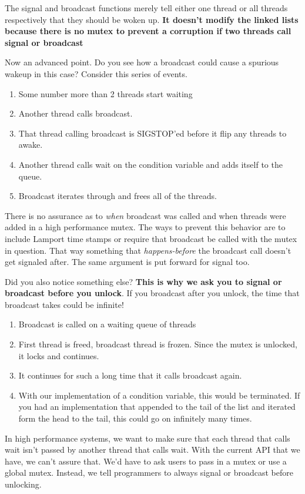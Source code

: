 The signal and broadcast functions merely tell either one thread or all threads respectively that they should be woken up.
\textbf{It doesn't modify the linked lists because there is no mutex to prevent a corruption if two threads call signal or broadcast}

Now an advanced point. Do you see how a broadcast could cause a spurious wakeup in this case? Consider this series of events.

\begin{enumerate}
\item Some number more than 2 threads start waiting
\item Another thread calls broadcast.
\item That thread calling broadcast is SIGSTOP'ed before it flip any threads to awake.
\item Another thread calls wait on the condition variable and adds itself to the queue.
\item Broadcast iterates through and frees all of the threads.
\end{enumerate}

There is no assurance as to \textit{when} broadcast was called and when threads were added in a high performance mutex.
The ways to prevent this behavior are to include Lamport time stamps or require that broadcast be called with the mutex in question.
That way something that \textit{happens-before} the broadcast call doesn't get signaled after.
The same argument is put forward for signal too.

Did you also notice something else?
\textbf{This is why we ask you to signal or broadcast before you unlock}.
If you broadcast after you unlock, the time that broadcast takes could be infinite!
\begin{enumerate}
\item Broadcast is called on a waiting queue of threads
\item First thread is freed, broadcast thread is frozen. Since the mutex is unlocked, it locks and continues.
\item It continues for such a long time that it calls broadcast again.
\item With our implementation of a condition variable, this would be terminated. If you had an implementation that appended to the tail of the list and iterated form the head to the tail, this could go on infinitely many times.
\end{enumerate}

In high performance systems, we want to make sure that each thread that calls wait isn't passed by another thread that calls wait.
With the current API that we have, we can't assure that.
We'd have to ask users to pass in a mutex or use a global mutex.
Instead, we tell programmers to always signal or broadcast before unlocking.

